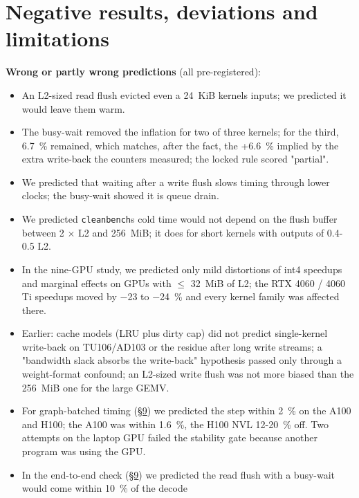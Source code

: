 \documentclass[11pt,a4paper]{article}
\providecommand{\tightlist}{\setlength{\itemsep}{0pt}\setlength{\parskip}{0pt}}
\begin{document}
\section{Negative results, deviations and limitations}\label{negative-results-deviations-and-limitations}

\textbf{Wrong or partly wrong predictions} (all pre-registered):

\begin{itemize}
\tightlist
\item
  An L2-sized read flush evicted even a 24~KiB kernel\textquotesingle s inputs; we predicted it would leave them warm.
\item
  The busy-wait removed the inflation for two of three kernels; for the third, 6.7~\% remained, which matches, after
  the fact, the +6.6~\% implied by the extra write-back the counters measured; the locked rule scored "partial".
\item
  We predicted that waiting after a write flush slows timing through lower clocks; the busy-wait showed it is
  queue drain.
\item
  We predicted \texttt{cleanbench}\textquotesingle s cold time would not depend on the flush buffer between 2 \ensuremath{\times} L2 and 256~MiB; it does
  for short kernels with outputs of 0.4-0.5 L2.
\item
  In the nine-GPU study, we predicted only mild distortions of int4 speedups and marginal effects on GPUs with
  \ensuremath{\le} 32~MiB of L2; the RTX 4060 / 4060 Ti speedups moved by \ensuremath{-}23 to \ensuremath{-}24~\% and every kernel family was affected there.
\item
  Earlier: cache models (LRU plus dirty cap) did not predict single-kernel write-back on TU106/AD103 or the residue
  after long write streams; a "bandwidth slack absorbs the write-back" hypothesis passed only through a
  weight-format confound; an L2-sized write flush was not more biased than the 256~MiB one for the large GEMV.
\item
  For graph-batched timing (\hyperref[end-to-end-check-which-number-predicts-a-decode-step]{\S{}9}) we predicted the step within 2~\% on the A100 and H100; the A100 was within 1.6~\%, the
  H100 NVL 12-20~\% off. Two attempts on the laptop GPU failed the stability gate because another program was using
  the GPU.
\item
  In the end-to-end check (\hyperref[end-to-end-check-which-number-predicts-a-decode-step]{\S{}9}) we predicted the read flush with a busy-wait would come within 10~\% of the decode

\end{itemize}
\end{document}
